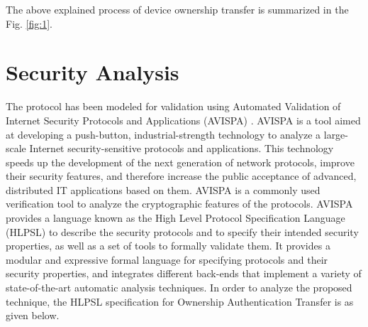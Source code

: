 \documentclass[letterpaper]{article}
\begin{document}
	The above explained process of device ownership transfer is summarized in the Fig. \ref{fig:1}.




\section{Security Analysis}
The protocol has been modeled for validation using Automated Validation of Internet Security Protocols and Applications (AVISPA) \cite{avispa} \cite{avispapro} \cite{lv}. AVISPA is a tool aimed at developing a push-button, industrial-strength technology to analyze a large-scale Internet security-sensitive protocols and applications. This technology speeds up the development of the next generation of network protocols, improve their security features, and therefore increase the public acceptance of advanced, distributed IT applications based on them. AVISPA is a commonly used verification tool to analyze the cryptographic features of the protocols. AVISPA provides a language known as the High Level Protocol Specification Language (HLPSL) \cite{hlpsl} to describe the security protocols and to specify their intended security properties, as well as a set of tools to formally validate them. It provides a modular and expressive formal language for specifying protocols and their security properties, and integrates different back-ends that implement a variety of state-of-the-art automatic analysis techniques. In order to analyze the proposed technique, the HLPSL specification for Ownership Authentication Transfer is as given below.
\end{document}
